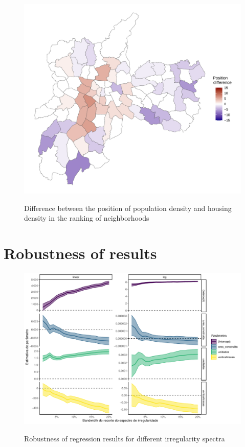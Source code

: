 \begin{apendicesenv}
    \begin{figure}[!h]
        \centering
        \caption{Difference between the position of population density and housing density in the ranking of neighborhoods}
        \includegraphics[width = \linewidth]{figuras/bairros-mapa-cotaparte.pdf}
        \label{fig:bairros-mapa-CP}
    \end{figure}
    
    
    
    
    
    \chapter{Robustness of results}
    \label{appendix:robustness}
    
    \begin{figure}[!h]
        \centering
        \caption{Robustness of regression results for different irregularity spectra}
        \includegraphics[width = \linewidth]{figuras/robustez-regressao1pop.pdf}
        \label{fig:robustez-reg1}
    \end{figure}
    

\end{apendicesenv}
